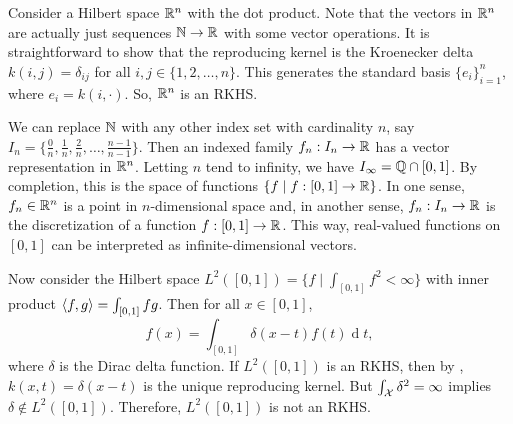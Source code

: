 Consider a Hilbert space \(\mathbb{R}^n\) with the dot product.
Note that the vectors in \(\mathbb{R}^n\) are actually just sequences \(\mathbb{N} \to \mathbb{R}\) with some vector operations.
It is straightforward to show that the reproducing kernel is the Kroenecker delta \(k(i,j) = \delta_{ij}\) for all \(i,j \in \{1,2,\dots,n\}\).
This generates the standard basis \(\{e_i\}_{i=1}^n\), where \(e_i = k(i,\cdot)\).
So, \(\mathbb{R}^n\) is an RKHS.

We can replace \(\mathbb{N}\) with any other index set with cardinality \(n\), say \(I_n = \{\frac{0}{n}, \frac{1}{n}, \frac{2}{n}, \dots, \frac{n-1}{n-1}\}\).
Then an indexed family \(f_n : I_n \to \mathbb{R}\) has a vector representation in \(\mathbb{R}^n\).
Letting \(n\) tend to infinity, we have \(I_\infty = \mathbb{Q} \cap [0,1]\).
By completion, this is the space of functions \(\{f \mid f : [0,1] \to \mathbb{R}\}\).
In one sense, \(f_n \in \mathbb{R}^n\) is a point in \(n\)-dimensional space and, in another sense, \(f_n : I_n \to \mathbb{R}\) is the discretization of a function \(f : [0,1] \to \mathbb{R}\).
This way, real-valued functions on \([0,1]\) can be interpreted as infinite-dimensional vectors.

Now consider the Hilbert space \(L^2({[0,1]}) = \{f \mid \int_{[0,1]} f^2 < \infty\}\) with inner product \(\left\langle f,g \right\rangle = \int_{[0,1]} fg\).
Then for all \(x \in {[0,1]}\),
\def\dd{\operatorname{d}}
\begin{equation}
    f(x) = \int_{[0,1]} \delta(x-t) f(t) \dd{t},
\end{equation}
where \(\delta\) is the Dirac delta function.
If \(L^2({[0,1]})\) is an RKHS, then by , \(k(x,t) = \delta(x-t)\) is the unique reproducing kernel.
But \(\int_{\mathcal{X}} \delta^2 = \infty\) implies \(\delta \notin L^2({[0,1]})\).
Therefore, \(L^2({[0,1]})\) is not an RKHS.